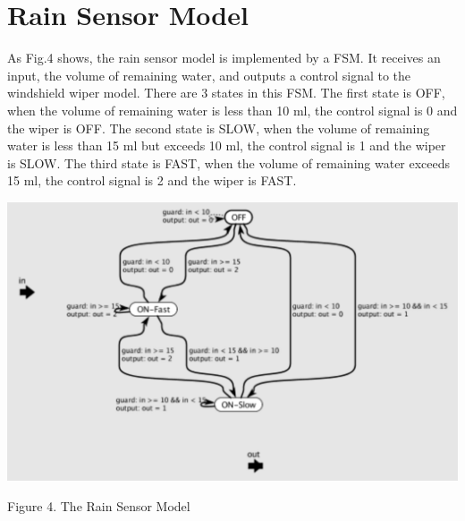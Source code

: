 \section{Rain Sensor Model}
As Fig.4 shows, the rain sensor model is implemented by a FSM. It receives an input, the volume of remaining water, and outputs a control signal to the windshield wiper model. There are 3 states in this FSM. The first state is OFF, when the volume of remaining water is less than 10 ml, the control signal is 0 and the wiper is OFF. The second state is SLOW, when the volume of remaining water is less than 15 ml but exceeds 10 ml, the control signal is 1 and the wiper is SLOW. The third state is FAST, when the volume of remaining water exceeds 15 ml, the control signal is 2 and the wiper is FAST.
\begin{center}
\includegraphics[width=13.5cm]{fig4.png}
\end{center}
\begin{center}
\small{Figure 4. The Rain Sensor Model}
\label{rain_sensor}
\end{center}